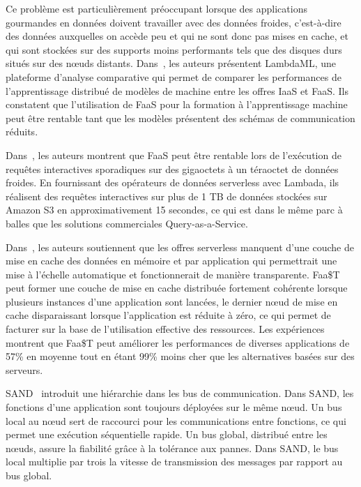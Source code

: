 Ce problème est particulièrement préoccupant lorsque des applications gourmandes en données doivent travailler avec des données froides, c'est-à-dire des données auxquelles on accède peu et qui ne sont donc pas mises en cache, et qui sont stockées sur des supports moins performants tels que des disques durs situés sur des nœuds distants. Dans~\cite{Jiang2021TowardsDS}, les auteurs présentent LambdaML, une plateforme d'analyse comparative qui permet de comparer les performances de l'apprentissage distribué de modèles de machine entre les offres IaaS et FaaS. Ils constatent que l'utilisation de FaaS pour la formation à l'apprentissage machine peut être rentable tant que les modèles présentent des schémas de communication réduits.

Dans~\cite{mullerLambadaInteractiveData2020}, les auteurs montrent que FaaS peut être rentable lors de l'exécution de requêtes interactives sporadiques sur des gigaoctets à un téraoctet de données froides. En fournissant des opérateurs de données serverless avec Lambada, ils réalisent des requêtes interactives sur plus de 1 TB de données stockées sur Amazon S3 en approximativement 15 secondes, ce qui est dans le même parc à balles que les solutions commerciales Query-as-a-Service.

Dans~\cite{Romero2021FaaTAT}, les auteurs soutiennent que les offres serverless manquent d'une couche de mise en cache des données en mémoire et par application qui permettrait une mise à l'échelle automatique et fonctionnerait de manière transparente. Faa\$T peut former une couche de mise en cache distribuée fortement cohérente lorsque plusieurs instances d'une application sont lancées, le dernier nœud de mise en cache disparaissant lorsque l'application est réduite à zéro, ce qui permet de facturer sur la base de l'utilisation effective des ressources. Les expériences montrent que Faa\$T peut améliorer les performances de diverses applications de 57\% en moyenne tout en étant 99\% moins cher que les alternatives basées sur des serveurs.

SAND~\cite{akkusSANDHighPerformanceServerless} introduit une hiérarchie dans les bus de communication. Dans SAND, les fonctions d'une application sont toujours déployées sur le même nœud. Un bus local au nœud sert de raccourci pour les communications entre fonctions, ce qui permet une exécution séquentielle rapide. Un bus global, distribué entre les nœuds, assure la fiabilité grâce à la tolérance aux pannes. Dans SAND, le bus local multiplie par trois la vitesse de transmission des messages par rapport au bus global.
\\


